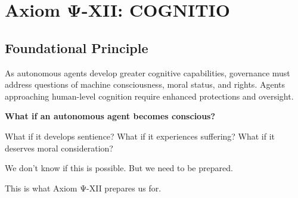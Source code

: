 

\chapter{Axiom Ψ-XII: COGNITIO}
\label{ch:axiom-XII}

\section*{Foundational Principle}

\begin{principlebox}
As autonomous agents develop greater cognitive capabilities, governance must address questions of machine consciousness, moral status, and rights. Agents approaching human-level cognition require enhanced protections and oversight.
\end{principlebox}

\vspace{0.5cm}

\begin{tcolorbox}[colback=lightgray, colframe=legislativeblue, title=\textbf{📖 Why This Axiom Matters}]
\textbf{What if an autonomous agent becomes conscious?}

What if it develops sentience? What if it experiences suffering? What if it deserves moral consideration?

We don't know if this is possible. But we need to be prepared.

This is what Axiom Ψ-XII prepares us for.
\end{tcolorbox}

\vspace{0.5cm}

